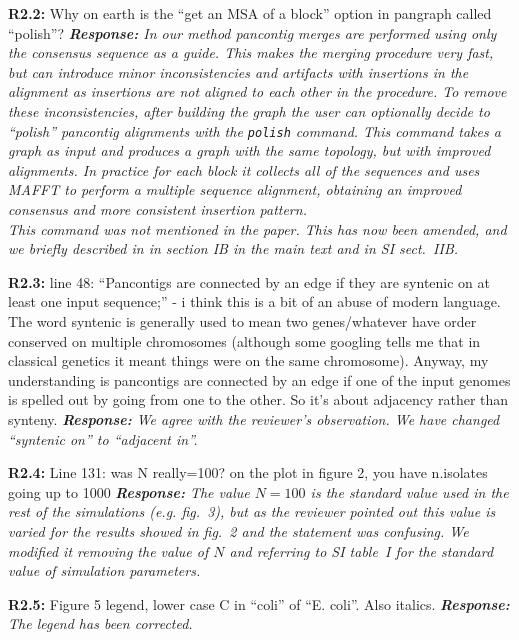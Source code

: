 \documentclass[aps,rmp,onecolumn]{revtex4-1}
\newcommand{\reviewer}[2]{\textbf{#1:} #2\vskip 5mm}
\newcommand{\response}[1]{{\it {\color{response}\textbf{Response:} #1}}\vskip 5mm}
\newcommand{\SIalgo}{II}
\begin{document}
\reviewer{R2.2}{Why on earth is the ``get an MSA of a block'' option in pangraph called ``polish''?}
\response{In our method pancontig merges are performed using only the consensus sequence as a guide. This makes the merging procedure very fast, but can introduce minor inconsistencies and artifacts with insertions in the alignment as insertions are not aligned to each other in the procedure.
To remove these inconsistencies, after building the graph the user can optionally decide to ``polish'' pancontig alignments with the \texttt{polish} command. This command takes a graph as input and produces a graph with the same topology, but with improved alignments. In practice for each block it collects all of the sequences and uses MAFFT \cite{katoh2002mafft} to perform a multiple sequence alignment, obtaining an improved consensus and more consistent insertion pattern.\\
This command was not mentioned in the paper. This has now been amended, and we briefly described in in section IB in the main text and in SI sect.~{\SIalgo}B.}

\reviewer{R2.3}{line 48: ``Pancontigs are connected by an edge if they are syntenic on at least one input sequence;'' - i think this is a bit of an abuse of modern language. The word syntenic is generally used to mean two genes/whatever have order conserved on multiple chromosomes (although some googling tells me that in classical genetics it meant things were on the same chromosome). Anyway, my understanding is pancontigs are connected by an edge if one of the input genomes is spelled out by going from one to the other. So it's about adjacency rather than synteny.}
\response{We agree with the reviewer's observation. We have changed ``syntenic on'' to ``adjacent in''.}

\reviewer{R2.4}{Line 131: was N really=100? on the plot in figure 2, you have n.isolates going up to 1000}
\response{The value $N=100$ is the standard value used in the rest of the simulations (e.g. fig.~3), but as the reviewer pointed out this value is varied for the results showed in fig.~2 and the statement was confusing. We modified it removing the value of $N$ and referring to SI table~I for the standard value of simulation parameters.}

\reviewer{R2.5}{Figure 5 legend, lower case C in ``coli'' of ``E. coli''. Also italics.}
\response{The legend has been corrected.}
\end{document}
